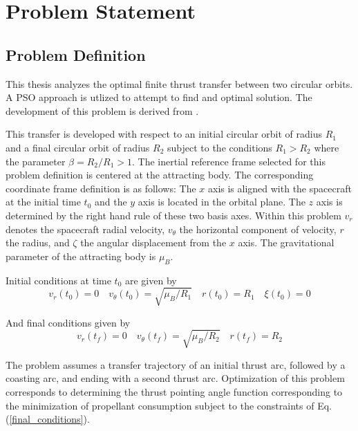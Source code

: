 \chapter{Problem Statement}

\section{Problem Definition}

This thesis analyzes the optimal finite thrust transfer between two circular orbits. A PSO approach is utlized to attempt
to find and optimal solution. The development of this problem is derived from \citep{Pontani_Conway}. \newline

This transfer is developed with respect to an initial circular orbit of radius $R_1$ and a final circular orbit of radius $R_2$ subject to the conditions $R_1 > R_2$ where the parameter $\beta = R_2/R_1 > 1$. 
The inertial reference frame selected for this problem definition is centered at the attracting body. The corresponding coordinate frame definition is as follows: The $x$ axis is aligned with the spacecraft at the initial time $t_0$ and the $y$ axis is located in the orbital plane.
The $z$ axis is determined by the right hand rule of these two basis axes. Within this problem $v_r$ denotes the spacecraft radial velocity, $v_\theta$ the horizontal component of velocity, $r$ the radius, and $\zeta$ the angular displacement from the $x$ axis. The gravitational
parameter of the attracting body is $\mu_B$. \newline

\noindent Initial conditions at time $t_0$ are given by
\begin{equation}
v_r(t_0) = 0  \quad  v_\theta(t_0) = \sqrt{\mu_B/R_1} \quad r(t_0) = R_1 \quad \xi(t_0) = 0
\label{initial_conditions}
\end{equation}

\noindent And final conditions given by
\begin{equation}
    v_r(t_f) = 0 \quad v_\theta(t_f) = \sqrt{\mu_B/R_2} \quad r(t_f) = R_2
    \label{final_conditions}
\end{equation}

The problem assumes a transfer trajectory of an initial thrust arc, followed by a coasting arc, and ending with a second thrust arc. 
Optimization of this problem corresponds to determining the thrust pointing angle function corresponding to the minimization of propellant consumption 
subject to the constraints of Eq. (\ref{final_conditions}).\newline

